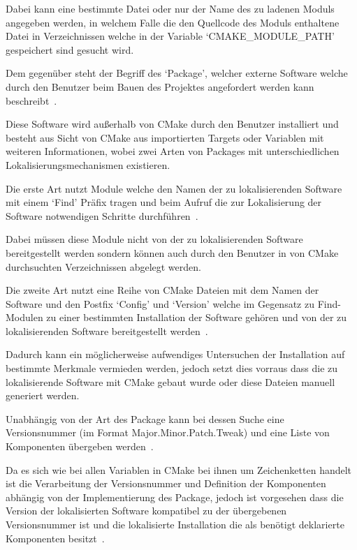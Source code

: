 \documentclass[german,proseminar,hyperref,utf8]{zihpub}
\begin{document}
    Dabei kann eine bestimmte Datei oder nur der Name des zu ladenen Moduls angegeben werden,
    in welchem Falle die den Quellcode des Moduls enthaltene Datei in Verzeichnissen welche in
    der Variable `CMAKE\_MODULE\_PATH' gespeichert sind gesucht wird.

    Dem gegenüber steht der Begriff des `Package', welcher externe Software welche durch den
    Benutzer beim Bauen des Projektes angefordert werden kann
    beschreibt~.

    Diese Software wird au{\ss}erhalb von CMake durch den Benutzer installiert und besteht aus
    Sicht von CMake aus importierten Targets oder Variablen mit weiteren Informationen, wobei
    zwei Arten von Packages mit unterschiedlichen Lokalisierungsmechanismen existieren.

    Die erste Art nutzt Module welche den Namen der zu lokalisierenden Software mit einem `Find'
    Präfix tragen und beim Aufruf die zur Lokalisierung der Software notwendigen Schritte
    durchführen~.

    Dabei müssen diese Module nicht von der zu lokalisierenden Software bereitgestellt werden sondern
    können auch durch den Benutzer in von CMake durchsuchten Verzeichnissen abgelegt werden.

    Die zweite Art nutzt eine Reihe von CMake Dateien mit dem Namen der Software und den Postfix `Config'
    und `Version' welche im Gegensatz zu Find-Modulen zu einer bestimmten Installation der Software
    gehören und von der zu lokalisierenden Software bereitgestellt
    werden~.

    Dadurch kann ein möglicherweise aufwendiges Untersuchen der Installation auf bestimmte Merkmale
    vermieden werden, jedoch setzt dies vorraus dass die zu lokalisierende Software mit CMake
    gebaut wurde oder diese Dateien manuell generiert werden.

    Unabhängig von der Art des Package kann bei dessen Suche eine Versionsnummer
    (im Format Major.Minor.Patch.Tweak) und eine Liste von Komponenten übergeben
    werden~.

    Da es sich wie bei allen Variablen in CMake bei ihnen um Zeichenketten handelt ist die Verarbeitung
    der Versionsnummer und Definition der Komponenten abhängig von der Implementierung des Package,
    jedoch ist vorgesehen dass die Version der lokalisierten Software kompatibel zu der übergebenen
    Versionsnummer ist und die lokalisierte Installation die als benötigt deklarierte Komponenten
    besitzt~.
\end{document}

